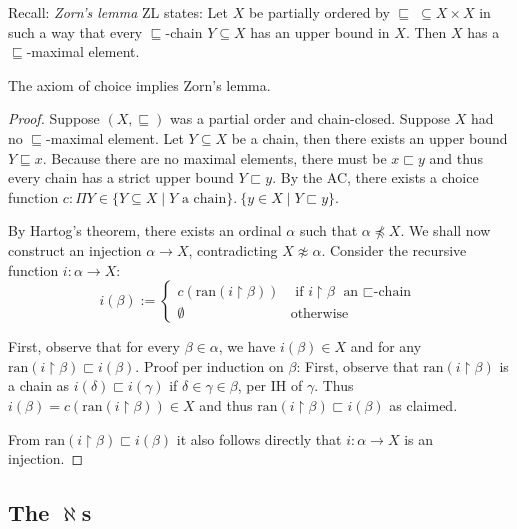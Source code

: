 \documentclass{whrartcl}
\newcommand{\ran}{\text{ran}}
\newcommand{\uh}{\upharpoonright}
\begin{document}
\begin{remark}
  Recall: 
  \emph{Zorn's lemma} ZL states: Let $X$ be partially ordered by $\sqsubseteq\;
  \subseteq X \times X$ in such a way that every $\sqsubseteq$-chain $Y \subseteq X$
  has an upper bound in $X$. Then $X$ has a $\sqsubseteq$-maximal element.
\end{remark}

\begin{theorem}
  The axiom of choice implies Zorn's lemma.
\end{theorem}
\begin{proof}
  Suppose $(X, \sqsubseteq)$ was a partial order and chain-closed. Suppose $X$
  had no $\sqsubseteq$-maximal element. Let $Y \subseteq X$ be a chain, then
  there exists an upper bound $Y \sqsubseteq x$. Because there are no maximal
  elements, there must be $x \sqsubset y$ and thus every chain has a strict
  upper bound $Y \sqsubset y$.
  By the AC, there exists a choice
  function $c : \Pi Y \in \{Y \subseteq X \mid Y \text{ a chain} \}.~\{y \in X
  \mid Y \sqsubset y\}$.

  By Hartog's
  theorem, there exists an ordinal $\alpha$ such that $\alpha \not\preceq X$.
  We shall now construct an injection $\alpha \to X$, contradicting $X
  \not\approx \alpha$. Consider the recursive function $i : \alpha \to X$:
  \[
    i(\beta) :=
    \begin{cases}
      c(\ran(i \uh \beta)) & \text{ if } i \uh \beta \text{ an $\sqsubset$-chain} \\
      \emptyset & \text{otherwise}
    \end{cases}
  \]

  First, observe that for every $\beta \in \alpha$, we have $i(\beta) \in X$ and
  for any $\ran(i \uh \beta) \sqsubset i(\beta)$. Proof per
  induction on $\beta$: First, observe that $\ran(i \uh \beta)$ is a chain
  as $i(\delta) \sqsubset i(\gamma)$ if $\delta \in \gamma \in \beta$, per IH of
  $\gamma$.
  Thus $i(\beta) = c(\ran(i \uh \beta)) \in X$ and thus $\ran(i \uh \beta) \sqsubset
  i(\beta)$ as claimed.

  From $\ran(i \uh \beta) \sqsubset i(\beta)$ it also follows directly that $i :
  \alpha \to X$ is an injection.
\end{proof}

\subsection{The $\aleph$s}
\end{document}
